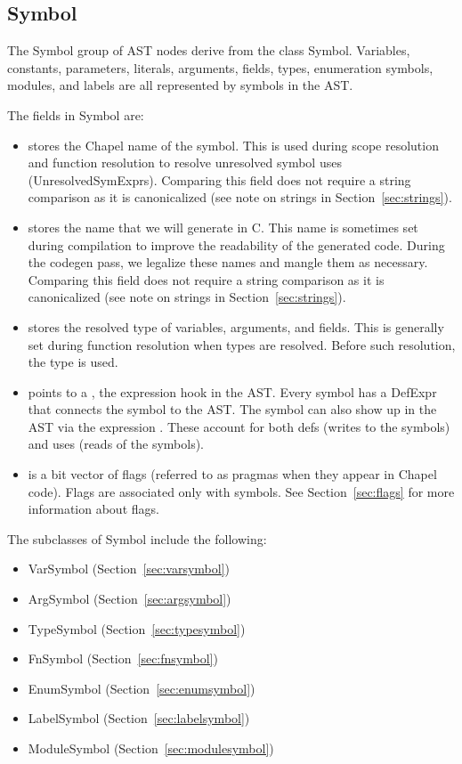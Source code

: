 \documentclass[10pt]{article}
\begin{document}
\subsection{Symbol}

The Symbol group of AST nodes derive from the class Symbol.
Variables, constants, parameters, literals, arguments, fields, types,
enumeration symbols, modules, and labels are all represented by
symbols in the AST.

The fields in Symbol are:
\begin{itemize}
\item {} stores the Chapel name of the symbol.
  This is used during scope resolution and function resolution to
  resolve unresolved symbol uses (UnresolvedSymExprs).  Comparing this
  field does not require a string comparison as it is canonicalized
  (see note on strings in Section~\ref{sec:strings}).
\item {} stores the name that we will generate in
  C.  This name is sometimes set during compilation to improve the
  readability of the generated code.  During the codegen pass, we
  legalize these names and mangle them as necessary.  Comparing this
  field does not require a string comparison as it is canonicalized
  (see note on strings in Section~\ref{sec:strings}).
\item {} stores the resolved type of variables,
  arguments, and fields.  This is generally set during function
  resolution when types are resolved.  Before such resolution, the
  type  is used.
\item {} points to a , the expression
  hook in the AST.  Every symbol has a DefExpr that connects the
  symbol to the AST.  The symbol can also show up in the AST via the
  expression .  These account for both defs (writes to the
  symbols) and uses (reads of the symbols).
\item {} is a bit vector of flags
  (referred to as pragmas when they appear in Chapel code).  Flags are
  associated only with symbols.  See Section~\ref{sec:flags} for more
  information about flags.
\end{itemize}

The subclasses of Symbol include the following:
\begin{itemize}
\item VarSymbol (Section~\ref{sec:varsymbol})
\item ArgSymbol (Section~\ref{sec:argsymbol})
\item TypeSymbol (Section~\ref{sec:typesymbol})
\item FnSymbol (Section~\ref{sec:fnsymbol})
\item EnumSymbol (Section~\ref{sec:enumsymbol})
\item LabelSymbol (Section~\ref{sec:labelsymbol})
\item ModuleSymbol (Section~\ref{sec:modulesymbol})
\end{itemize}
\end{document}
